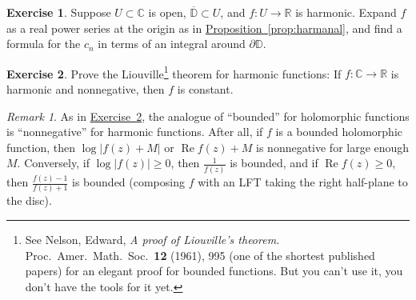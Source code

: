 \documentclass[12pt,openany]{book}
\renewcommand{\Re}{\operatorname{Re}}
\newcommand{\sabs}[1]{\lvert {#1} \rvert}
\newcommand{\C}{{\mathbb{C}}}
\newcommand{\R}{{\mathbb{R}}}
\newcommand{\D}{{\mathbb{D}}}
\newcommand{\myquote}[1]{``#1''}
\theoremstyle{plain}
\theoremstyle{remark}
\newtheorem{remark}[thm]{Remark}
\theoremstyle{definition}
\newenvironment{exbox}{%
    \def\FrameCommand{\vrule width 1pt \relax\hspace{10pt}}%
    \MakeFramed{\advance\hsize-\width\FrameRestore}%
}{%
    \endMakeFramed
}
\theoremstyle{exercise}
\newtheorem{exercise}{Exercise}[section]
\theoremstyle{example}
\newcommand{\exerciseref}[1]{\hyperref[#1]{Exercise~\ref*{#1}}}
\newcommand{\propref}[1]{\hyperref[#1]{Proposition~\ref*{#1}}}
\begin{document}
\begin{savenotes}
\begin{exbox}
\begin{exercise}
Suppose $U \subset \C$ is open, $\overline{\D} \subset U$,
and $f \colon U \to \R$ is harmonic.  Expand
$f$ as a real power series at the origin as in \propref{prop:harmanal}, and find a formula
for the $c_n$ in terms
of an integral around $\partial \D$.
\end{exercise}

\begin{exercise}\label{exercise:Liouvilleharmonic}
\pagebreak[2]
Prove the Liouville\footnote{%
See
Nelson, Edward,
\emph{A proof of Liouville's theorem.}
Proc.\ Amer.\ Math.\ Soc.\ {\textbf{12}} (1961), 995
(one of the shortest published papers) for
an elegant proof for bounded functions.
But you can't use it, you don't have the
tools for it yet.} theorem for
harmonic functions:  If $f \colon \C \to \R$ is harmonic
and nonnegative, then $f$ is constant.
\end{exercise}
\end{exbox}
\end{savenotes}

\begin{remark}
As in \exerciseref{exercise:Liouvilleharmonic},
the analogue of \myquote{bounded} for holomorphic functions is
\myquote{nonnegative}
for harmonic functions.  After all, if $f$ is
a bounded holomorphic function, then $\log \sabs{f(z)+M}$ or $\Re f(z) + M$
is nonnegative for large enough $M$.  Conversely, if $\log \sabs{f(z)} \geq
0$, then $\frac{1}{f(z)}$ is bounded, and if $\Re f(z) \geq 0$, then
$\frac{f(z)-1}{f(z)+1}$ is bounded (composing $f$ with an LFT taking the
right half-plane to the disc).
\end{remark}
\end{document}
